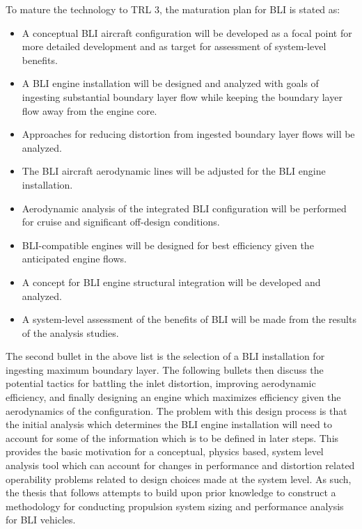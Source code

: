 To mature the technology to TRL 3, the maturation plan for BLI is stated as:

\begin{itemize}
\item{A conceptual BLI aircraft configuration will be developed as a focal point for more detailed
development and as target for assessment of system-level benefits.}
\item{A BLI engine installation will be designed and analyzed with goals of ingesting substantial
boundary layer flow while keeping the boundary layer flow away from the engine core.}
\item{Approaches for reducing distortion from ingested boundary layer flows will be analyzed.}
\item{The BLI aircraft aerodynamic lines will be adjusted for the BLI engine installation.}
\item{Aerodynamic analysis of the integrated BLI configuration will be performed for cruise and
significant off-design conditions.}
\item{BLI-compatible engines will be designed for best efficiency given the anticipated engine flows.}
\item{A concept for BLI engine structural integration will be developed and analyzed.}
\item{A system-level assessment of the benefits of BLI will be made from the results of the analysis
studies.}
\end{itemize}

The second bullet in the above list is the selection of a BLI installation for ingesting maximum boundary layer.  The following bullets then discuss the potential tactics for battling the inlet distortion, improving aerodynamic efficiency, and finally designing an engine which maximizes efficiency given the aerodynamics of the configuration.  The problem with this design process is that the initial analysis which determines the BLI engine installation will need to account for some of the information which is to be defined in later steps.  This provides the basic motivation for a conceptual, physics based, system level analysis tool which can account for changes in performance and distortion related operability problems related to design choices made at the system level.  As such, the thesis that follows attempts to build upon prior knowledge to construct a methodology for conducting propulsion system sizing and performance analysis for BLI vehicles.  

